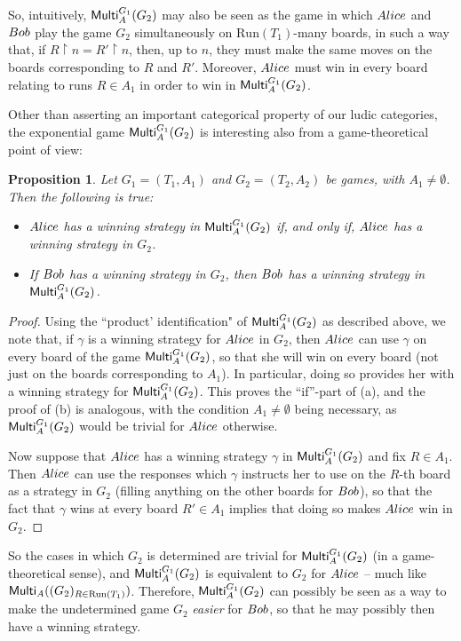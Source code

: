 \documentclass[12pt]{amsart}
\newtheorem{prop}[thm]{Proposition}
\theoremstyle{definition}
\newcommand{\ali}{\textup{\textmd{\textsc{Alice}}}}
\newcommand{\bob}{\textup{\textmd{\textsc{Bob}}}}
\newcommand{\A}{\textup{\textmd{\textsc{A}}}}
\newcommand{\Run}{{\mathrm{Run}}}
\DeclareMathOperator{\restrict}{\upharpoonright}
\newcommand{\Multi}{\mathsf{Multi}}
\begin{document}
So, intuitively, $\Multi_\A^{G_1}(G_2)$ may also be seen as the game in which $\ali$ and $\bob$ play the game $G_2$ simultaneously on $\Run(T_1)$-many boards, in such a way that, if $R\restrict n = R'\restrict n $, then, up to $n$, they must make the same moves on the boards corresponding to $R$ and $R'$. Moreover, $\ali$ must win in every board relating to runs $R\in A_1$ in order to win in $\Multi_\A^{G_1}(G_2)$.

Other than asserting an important categorical property of our ludic categories, 
the exponential game $\Multi_\A^{G_1}(G_2)$ is interesting also from a game-theoretical point of view:

\begin{prop}
	Let $G_1=(T_1,A_1)$ and $G_2=(T_2,A_2)$ be games, with $A_1\neq\emptyset$. Then the following is true:
	\begin{itemize}
		\item[(a)] $\ali$ has a winning strategy in $\Multi_\A^{G_1}(G_2)$ if, and only if, $\ali$ has a winning strategy in $G_2$.
		\item[(b)] If $\bob$ has a winning strategy in $G_2$, then $\bob$ has a winning strategy in $\Multi_\A^{G_1}(G_2)$.
	\end{itemize}
\end{prop}
\begin{proof}
	Using the ``product' identification" of $\Multi_\A^{G_1}(G_2)$ as described above, we
	note that, if $\gamma$ is a winning strategy for $\ali$ in $G_2$, then $\ali$ can use $\gamma$ on every board of the game $\Multi_\A^{G_1}(G_2)$, so that she will win on every board (not just on the boards corresponding to $A_1$). In particular, doing so provides her with a winning strategy for $\Multi_\A^{G_1}(G_2)$. This proves the ``if''-part of (a), and  the proof of (b) is analogous, with the condition $A_1\neq \emptyset$ being necessary, as $\Multi_\A^{G_1}(G_2)$ would be trivial for $\ali$ otherwise.
	
	Now suppose that $\ali$ has a winning strategy $\gamma$ in $\Multi_\A^{G_1}(G_2)$ and fix $R\in A_1$. Then $\ali$ can use the responses which $\gamma$ instructs her to use on the $R$-th board as a strategy in $G_2$ (filling anything on the other boards for $\bob$), so that the fact that $\gamma$ wins at every board $R'\in A_1$ implies that doing so makes $\ali$ win in $G_2$.
\end{proof}

So the cases in which $G_2$ is determined are trivial for $\Multi_\A^{G_1}(G_2)$ (in a game-theoretical sense), and $\Multi_\A^{G_1}(G_2)$ is equivalent to $G_2$ for $\ali$ -- much like $\Multi_\A((G_2)_{R\in \Run(T_1)})$. Therefore, $\Multi_\A^{G_1}(G_2)$ can possibly be seen as a way to make the undetermined game $G_2$ \textit{easier} for $\bob$, so that he may possibly then have a winning strategy.
\end{document}
